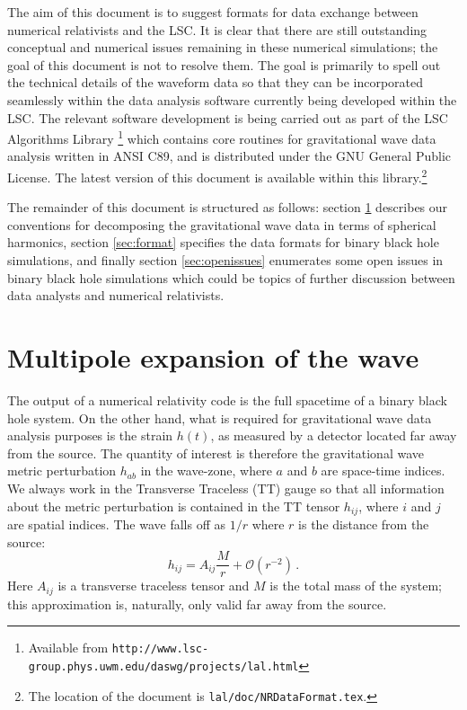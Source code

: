 \documentclass[prd,preprintnumbers,superscriptaddress,eqsecnum]{revtex4}
\numberwithin{equation}{section}
\begin{document}
{The aim of this document is to suggest formats for data exchange
between numerical relativists and the LSC.  It is clear that there are
still outstanding conceptual and numerical issues remaining in these
numerical simulations; the goal of this document is not to resolve
them.  The goal is primarily to spell out the technical details of the
waveform data so that they can be incorporated seamlessly within the
data analysis software currently being developed within the LSC.  The
relevant software development is being carried out as part of the LSC
Algorithms Library \footnote{Available from
  \texttt{http://www.lsc-group.phys.uwm.edu/daswg/projects/lal.html}}
which contains core routines for gravitational wave data analysis
written in ANSI C89, and is distributed under the GNU General Public
License.  The latest version of this document is available within this
library.\footnote{The location of the document is
  \texttt{lal/doc/NRDataFormat.tex}.}
  
The remainder of this document is structured as follows: section
\ref{sec:multipoles} describes our conventions for decomposing the
gravitational wave data in terms of spherical harmonics, section
\ref{sec:format} specifies the data formats for binary black hole
simulations, and finally section \ref{sec:openissues} enumerates some
open issues in binary black hole simulations which could be topics of
further discussion between data analysts and numerical relativists.



\section{Multipole expansion of the wave}
\label{sec:multipoles}


The output of a numerical relativity code is the full spacetime of a
binary black hole system. On the other hand, what is required for
gravitational wave data analysis purposes is the strain $h(t)$, as
measured by a detector located far away from the source.  The quantity
of interest is therefore the gravitational wave metric perturbation
$h_{ab}$ in the wave-zone, where $a$ and $b$ are space-time indices.
We always work in the Transverse Traceless (TT) gauge so that all
information about the metric perturbation is contained in the TT
tensor $h_{ij}$, where $i$ and $j$ are spatial indices.  The wave
falls off as $1/r$ where $r$ is the distance from the source:
\begin{equation}
  \label{eq:1}
  h_{ij} = A_{ij}\frac{M}{r} + \mathcal{O}\left(r^{-2}\right)\,.
\end{equation}
Here $A_{ij}$ is a transverse traceless tensor and $M$ is the total
mass of the system; this approximation is, naturally, only valid far
away from the source.

}
\end{document}
